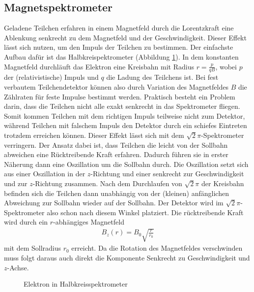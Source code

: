 \subsection{Magnetspektrometer}
Geladene Teilchen erfahren in einem Magnetfeld durch die Lorentzkraft eine Ablenkung senkrecht zu dem Magnetfeld und der Geschwindigkeit. Dieser Effekt lässt sich nutzen, um den Impuls der Teilchen zu bestimmen. Der einfachste Aufbau dafür ist das Halbkreispektrometer (Abbildung \ref{fig:halbkreis}). In dem konstanten Magnetfeld durchläuft das Elektron eine Kreisbahn mit Radius $r=\frac{p}{qB}$, wobei $p$ der (relativistische) Impuls und $q$ die Ladung des Teilchens ist. Bei fest verbautem Teilchendetektor können also durch Variation des Magnetfeldes $B$ die Zählraten für feste Impulse bestimmt werden. Praktisch besteht ein Problem darin, dass die Teilchen nicht alle exakt senkrecht in das Spektrometer fliegen. Somit kommen Teilchen mit dem richtigen Impuls teilweise nicht zum Detektor, während Teilchen mit falschem Impuls den Detektor durch ein schiefes Eintreten trotzdem erreichen können. Dieser Effekt lässt sich mit dem $\sqrt{2}\pi$-Spektrometer verringern. Der Ansatz dabei ist, dass Teilchen die leicht von der Sollbahn abweichen eine Rücktreibende Kraft erfahren. Dadurch führen sie in erster Näherung dann eine Oszillation um die Sollbahn durch. Die Oszillation setzt sich aus einer Oszillation in der $z$-Richtung und einer senkrecht zur Geschwindigkeit und zur $z$-Richtung zusammen. Nach dem Durchlaufen von $\sqrt{2}\pi$ der Kreisbahn befinden sich die Teilchen dann unabhängig von der (kleinen) anfänglichen Abweichung zur Sollbahn wieder auf der Sollbahn. Der Detektor wird im $\sqrt{2}\pi$-Spektrometer also schon nach diesem Winkel platziert. Die rücktreibende Kraft wird durch ein $r$-abhängiges Magnetfeld 
\begin{align*}
  B_z(r)=B_0\sqrt{\frac{r}{r_0}}
\end{align*}
mit dem Sollradius $r_0$ erreicht. Da die Rotation des Magnetfeldes verschwinden muss folgt daraus auch direkt die Komponente Senkrecht zu Geschwindigkeit und $z$-Achse.
\begin{figure}[h]
  \centering
  \caption{Elektron in Halbkreisspektrometer}
  \label{fig:halbkreis}
\end{figure}
